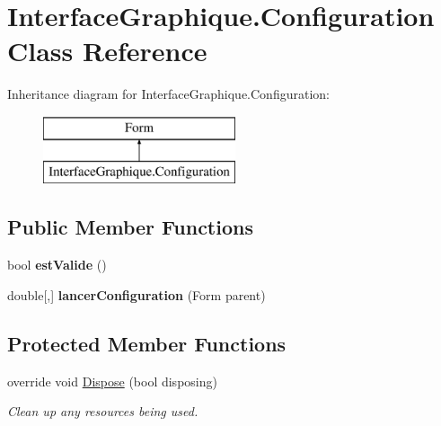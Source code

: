 \hypertarget{class_interface_graphique_1_1_configuration}{}\section{Interface\+Graphique.\+Configuration Class Reference}
\label{class_interface_graphique_1_1_configuration}
Inheritance diagram for Interface\+Graphique.\+Configuration\+:\begin{figure}[H]
\begin{center}
\leavevmode
\includegraphics[height=2.000000cm]{class_interface_graphique_1_1_configuration}
\end{center}
\end{figure}
\subsection*{Public Member Functions}
\begin{DoxyCompactItemize}
\item 
bool {\bfseries est\+Valide} ()\hypertarget{class_interface_graphique_1_1_configuration_a0a11a238d2ee91e02998bade78fe5d39}{}\label{class_interface_graphique_1_1_configuration_a0a11a238d2ee91e02998bade78fe5d39}

\item 
double\mbox{[},\mbox{]} {\bfseries lancer\+Configuration} (Form parent)\hypertarget{class_interface_graphique_1_1_configuration_a2643ab0e2cfdb0a6eee2bc739f337cc1}{}\label{class_interface_graphique_1_1_configuration_a2643ab0e2cfdb0a6eee2bc739f337cc1}

\end{DoxyCompactItemize}
\subsection*{Protected Member Functions}
\begin{DoxyCompactItemize}
\item 
override void \hyperlink{class_interface_graphique_1_1_configuration_a0200b084946b5710be7d94f9e8b0385c}{Dispose} (bool disposing)
\begin{DoxyCompactList}\small\item\em Clean up any resources being used. \end{DoxyCompactList}\end{DoxyCompactItemize}
